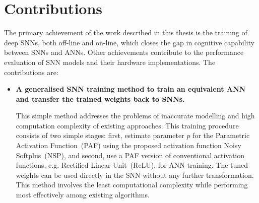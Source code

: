 \section{Contributions}
The primary achievement of the work described in this thesis is the training of deep SNNs, both off-line and on-line, which closes the gap in cognitive capability between SNNs and ANNs.
Other achievements contribute to the performance evaluation of SNN models and their hardware implementations.
The contributions are:
\begin{itemize}
%	
	
	\item 
	\textbf{A generalised SNN training method to train an equivalent ANN and transfer the trained weights back to SNNs.}
	
	This simple method addresses the problems of inaccurate modelling and high computation complexity of existing approaches.
	This training procedure consists of two simple stages: first, estimate parameter $p$ for the Parametric Activation Function~(PAF) using the proposed activation function Noisy Softplus~(NSP), and second, use a PAF version of conventional activation functions, e.g. Rectified Linear Unit~(ReLU), for ANN training. %
	The tuned weights can be used directly in the SNN without any further transformation.
	This method involves the least computational complexity while performing most effectively among existing algorithms.



\end{itemize}
